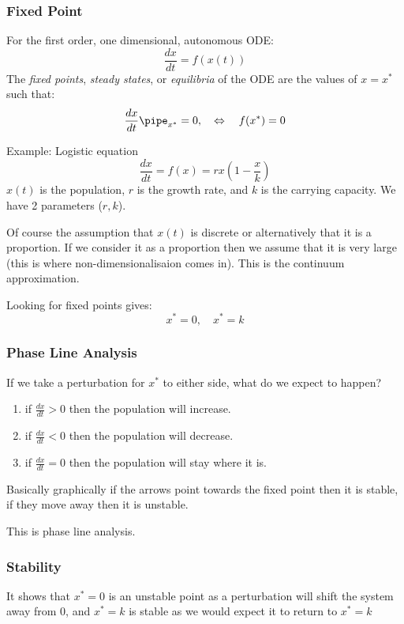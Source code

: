 \documentclass{X:/Documents/Coding/Latex/myassignment}
\begin{document}
\subsubsection{Fixed Point}
For the first order, one dimensional, autonomous ODE:
\[\frac{dx}{dt} = f(x(t))\]
The \textit{fixed points}, \textit{steady states}, or \textit{equilibria} of the ODE are the values of $x = x^*$ such that:
\[\frac{dx}{dt}\pipe_{x^*} = 0, \quad \Leftrightarrow \quad f(x^*)=0 \]

Example: Logistic equation
\[\frac{dx}{dt} = f(x) = rx(1-\frac{x}{k})\]
$x(t)$ is the population, $r$ is the growth rate, and $k$ is the carrying capacity. We have 2 parameters ($r,k$).

Of course the assumption that $x(t)$ is discrete or alternatively that it is a proportion. If we consider it as a proportion then we assume that it is very large (this is where non-dimensionalisaion comes in). This is the continuum approximation.

Looking for fixed points gives:
\[x^* = 0, \quad x^* = k\]

\subsubsection{Phase Line Analysis}
If we take a perturbation for $x^*$ to either side, what do we expect to happen?
\begin{enumerate}
    \item if $\frac{dx}{dt} > 0$ then the population will increase. 
    \item if $\frac{dx}{dt} < 0$ then the population will decrease.
    \item if $\frac{dx}{dt} = 0$ then the population will stay where it is.
\end{enumerate} 
Basically graphically if the arrows point towards the fixed point then it is stable, if they move away then it is unstable.

This is phase line analysis.



\subsubsection{Stability}

It shows that $x^*=0$ is an unstable point as a perturbation will shift the system away from $0$, and $x^*=k$ is stable as we would expect it to return to $x^*=k$
\end{document}
